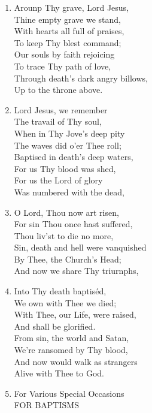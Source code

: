 \documentclass[11pt,a4paper]{article}
\begin{document}
\begin{enumerate}
    \item Arounp Thy grave, Lord Jesus, \\
        Thine empty grave we stand, \\
        With hearts all full of praises, \\
        To keep Thy blest command; \\
        Our souls by faith rejoicing \\
        To trace Thy path of love, \\
        Through death's dark angry billows, \\
        Up to the throne above.

    \item Lord Jesus, we remember \\
        The travail of Thy soul, \\
        When in Thy Jove's deep pity \\
        The waves did o'er Thee roll; \\
        Baptised in death's deep waters, \\
        For us Thy blood was shed, \\
        For us the Lord of glory \\
        Was numbered with the dead,

    \item O Lord, Thou now art risen, \\
        For sin Thou once hast suffered, \\
        Thou liv'st to die no more, \\
        Sin, death and hell were vanquished \\
        By Thee, the Church's Head; \\
        And now we share Thy triurnphs,

    \item Into Thy death baptiséd, \\
        We own with Thee we died; \\
        With Thee, our Life, were raised, \\
        And shall be glorified. \\
        From sin, the world and Satan, \\
        We're ransomed by Thy blood, \\
        And now would walk as strangers \\
        Alive with Thee to God.

    \item For Various Special Occasions \\
        FOR BAPTISMS

\end{enumerate}
\end{document}
